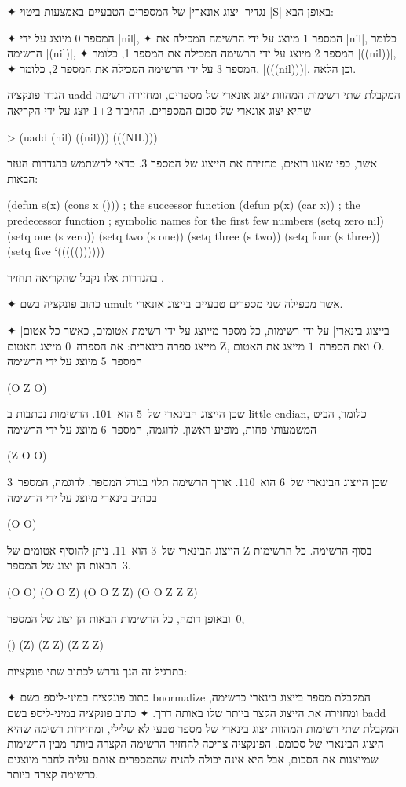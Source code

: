 \begin{enumerate}
  ✦ נגדיר \ע|יצוג אונארי| של המספרים הטבעיים באמצעות ביטוי-\E|S| באופן הבא:
  \begin{itemize}
    ✦ המספר 0 מיוצג על ידי \E|nil|,
    ✦ המספר 1 מיוצג על ידי הרשימה המכילה את \E|nil|, כלומר הרשימה \E|(nil)|,
    ✦ המספר 2 מיוצג על ידי הרשימה המכילה את המספר 1, כלומר \E|((nil))|,
    ✦ המספר 3 על ידי הרשימה המכילה את המספר 2, כלומר, \E|(((nil)))|,
    וכן הלאה.
  \end{itemize}
  הגדר פונקציה uadd המקבלת שתי רשימות המהוות יצוג אונארי של מספרים,
  ומחזירה רשימה שהיא יצוג אונארי של סכום המספרים. החיבור 1+2 יוצג על ידי
  הקריאה
  \begin{LISP}
> (uadd (nil) ((nil)))
(((NIL)))
\end{LISP}
  אשר, כפי שאנו רואים, מחזירה את הייצוג של המספר 3.
  כדאי להשתמש בהגדרות העזר הבאות:
  \begin{LISP}
(defun s(x) (cons x ())) ; the successor function
(defun p(x) (car x)) ; the predecessor function
; symbolic names for the first few numbers
(setq zero nil)
(setq one (s zero))
(setq two (s one))
(setq three (s two))
(setq four (s three))
(setq five ‘((((())))))
\end{LISP}
  בהגדרות אלו נקבל שהקריאה
  תחזיר \lisp{((((()))))}.

  ✦ כתוב פונקציה בשם umult אשר מכפילה שני מספרים טבעיים בייצוג אונארי.

  ✦ \ע|בייצוג בינארי| על ידי רשימות, כל מספר מייוצג על ידי רשימת אטומים, כאשר
  כל אטום מייצג ספרה בינארית: את הספרה~$0$ מייצג האטום Z, ואת הספרה~$1$ מייצג
  את האטום O. המספר~$5$ מיוצג על ידי הרשימה \begin{LISP}
(O Z O)
\end{LISP} שכן הייצוג הבינארי של~$5$ הוא~$101$. הרשימות נכתבות ב-little-endian,
  כלומר, הביט המשמעותי פחות, מופיע ראשון. לדוגמה, המספר~$6$ מיוצג על ידי הרשימה
  \begin{LISP}
 (Z O O)
 \end{LISP}
  שכן הייצוג הבינארי של~$6$ הוא~$110$. אורך הרשימה תלוי בגודל המספר.
  לדוגמה, המספר~$3$ בכתיב בינארי מיוצג על ידי הרשימה
  \begin{LISP}
 (O O)
 \end{LISP} הייצוג הבינארי של~$3$ הוא~$11$. ניתן להוסיף אטומים של Z בסוף
  הרשימה. כל הרשימות הבאות הן יצוג של המספר~$3$.
  \begin{LISP}
(O O)
(O O Z)
(O O Z Z)
(O O Z Z Z)
\end{LISP}
  ובאופן דומה, כל הרשימות הבאות הן יצוג של המספר~$0$,
  \begin{LISP}
()
(Z)
(Z Z)
(Z Z Z)
\end{LISP}
  בתרגיל זה הנך נדרש לכתוב שתי פונקציות:
  \begin{itemize}
    ✦ כתוב פונקציה במיני-ליספ בשם bnormalize המקבלת מספר בייצוג בינארי כרשימה,
    ומחזירה את הייצוג הקצר ביותר שלו באותה דרך.
    ✦ כתוב פונקציה במיני-ליספ בשם badd המקבלת שתי רשימות המהוות יצוג בינארי
    של מספר טבעי לא שלילי, ומחזירות רשימה שהיא היצוג הבינארי של סכומם.
    הפונקציה צריכה להחזיר הרשימה הקצרה ביותר מבין הרשימות שמייצגות את הסכום,
    אבל היא אינה יכולה להניח שהמספרים אותם עליה לחבר מיוצגים כרשימה קצרה
    ביותר.
  \end{itemize}


\end{enumerate}
